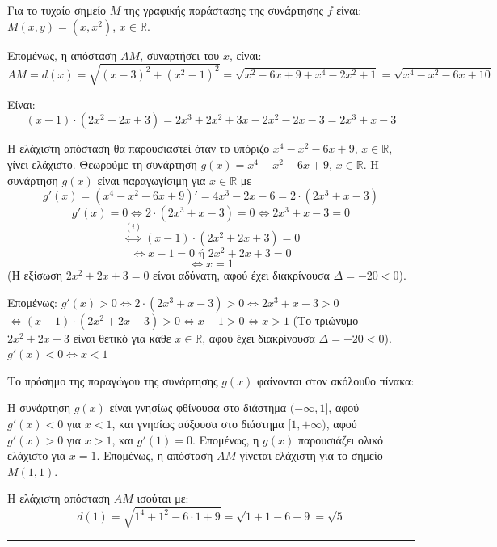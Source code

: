 \begin{alist}
\item Για το τυχαίο σημείο $M$ της γραφικής παράστασης της συνάρτησης $f$ είναι:
$M(x,y) = (x,x^2)$, $x \in \mathbb{R}$.

Επομένως, η απόσταση $AM$, συναρτήσει του $x$, είναι:
\[ AM = d(x) = \sqrt{(x-3)^2 + (x^2-1)^2} = \sqrt{x^2 - 6x + 9 + x^4 - 2x^2 + 1} = \sqrt{x^4 - x^2 - 6x + 10} \]
\item 
\begin{rlist}
\item Είναι:
\[ (x-1) \cdot (2x^2+2x+3) = 2x^3 + 2x^2 + 3x - 2x^2 - 2x - 3 = 2x^3 + x - 3 \]
\item Η ελάχιστη απόσταση θα παρουσιαστεί όταν το υπόριζο $x^4 - x^2 - 6x + 9$, $x \in \mathbb{R}$, γίνει ελάχιστο.
Θεωρούμε τη συνάρτηση $g(x) = x^4 - x^2 - 6x + 9$, $x \in \mathbb{R}$. Η συνάρτηση $g(x)$ είναι παραγωγίσιμη για $x \in \mathbb{R}$ με
\[ g'(x) = (x^4 - x^2 - 6x + 9)' = 4x^3 - 2x - 6 = 2 \cdot (2x^3 + x - 3) \]
\[ g'(x) = 0 \Leftrightarrow 2 \cdot (2x^3 + x - 3) = 0 \Leftrightarrow 2x^3 + x - 3 = 0 \]
\[ \stackrel{(i)}{\Leftrightarrow} (x-1) \cdot (2x^2+2x+3) = 0 \]
\[ \Leftrightarrow x-1=0 \text{ ή } 2x^2+2x+3=0 \]
\[ \Leftrightarrow x=1 \]
(Η εξίσωση $2x^2+2x+3=0$ είναι αδύνατη, αφού έχει διακρίνουσα $\Delta = -20 < 0$).

Επομένως:
$g'(x) > 0 \Leftrightarrow 2 \cdot (2x^3 + x - 3) > 0 \Leftrightarrow 2x^3 + x - 3 > 0$
$\Leftrightarrow (x-1) \cdot (2x^2+2x+3) > 0 \Leftrightarrow x-1 > 0 \Leftrightarrow x > 1$
(Το τριώνυμο $2x^2+2x+3$ είναι θετικό για κάθε $x \in \mathbb{R}$, αφού έχει διακρίνουσα $\Delta = -20 < 0$).
$g'(x) < 0 \Leftrightarrow x < 1$

Το πρόσημο της παραγώγου της συνάρτησης $g(x)$ φαίνονται στον ακόλουθο πίνακα:

Η συνάρτηση $g(x)$ είναι γνησίως φθίνουσα στο διάστημα $(-\infty, 1]$, αφού $g'(x) < 0$ για $x < 1$, και γνησίως αύξουσα στο διάστημα $[1, +\infty)$, αφού $g'(x) > 0$ για $x > 1$, και $g'(1) = 0$. Επομένως, η $g(x)$ παρουσιάζει ολικό ελάχιστο για $x=1$.
Επομένως, η απόσταση $AM$ γίνεται ελάχιστη για το σημείο $M(1,1)$.
\end{rlist}
\item Η ελάχιστη απόσταση $AM$ ισούται με:
\[ d(1) = \sqrt{1^4 + 1^2 - 6 \cdot 1 + 9} = \sqrt{1+1-6+9} = \sqrt{5} \]

\end{alist}
\vspace{6mm}
\noindent\rule{\textwidth}{0.4pt}
\vspace{6mm}

